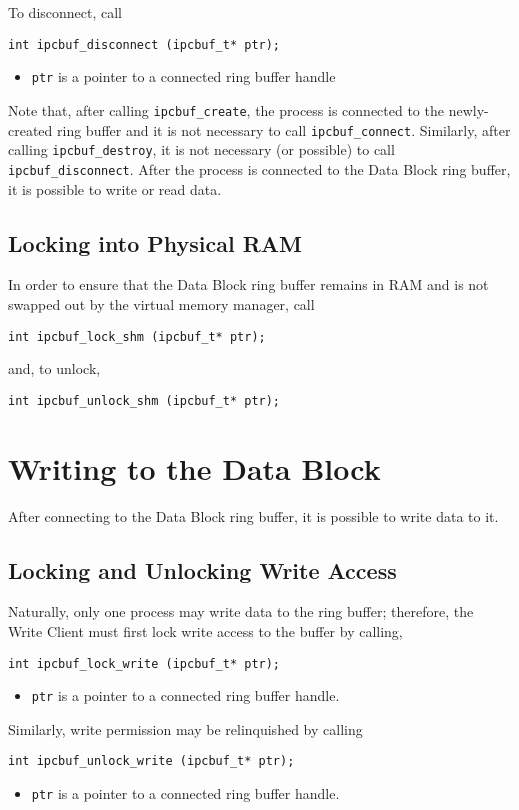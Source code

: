 To disconnect, call
\begin{verbatim}
int ipcbuf_disconnect (ipcbuf_t* ptr);
\end{verbatim}
\vspace{-6mm}
\begin{itemize}
\item {\tt ptr} is a pointer to a connected ring buffer handle
\end{itemize}
Note that, after calling {\tt ipcbuf\_create}, the process is connected
to the newly-created ring buffer and it is not necessary to call 
{\tt ipcbuf\_connect}.  Similarly, after calling {\tt ipcbuf\_destroy},
it is not necessary (or possible) to call {\tt ipcbuf\_disconnect}.
After the process is connected to the Data Block ring buffer, it is
possible to write or read data.

\subsection{Locking into Physical RAM}

In order to ensure that the Data Block ring buffer remains in RAM and
is not swapped out by the virtual memory manager, call
\begin{verbatim}
int ipcbuf_lock_shm (ipcbuf_t* ptr);
\end{verbatim}
and, to unlock,
\begin{verbatim}
int ipcbuf_unlock_shm (ipcbuf_t* ptr);
\end{verbatim}


\section{Writing to the Data Block}

After connecting to the Data Block ring buffer, it is
possible to write data to it.

\subsection{Locking and Unlocking Write Access}

Naturally, only one process may write data to the ring buffer;
therefore, the Write Client must first lock write access to the buffer
by calling,
\begin{verbatim}
int ipcbuf_lock_write (ipcbuf_t* ptr);
\end{verbatim}
\vspace{-6mm}
\begin{itemize}
\item {\tt ptr} is a pointer to a connected ring buffer handle.
\end{itemize}
Similarly, write permission may be relinquished by calling
\begin{verbatim}
int ipcbuf_unlock_write (ipcbuf_t* ptr);
\end{verbatim}
\vspace{-6mm}
\begin{itemize}
\item {\tt ptr} is a pointer to a connected ring buffer handle.
\end{itemize}

